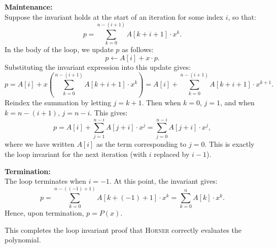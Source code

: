 \documentclass[11pt]{article}
\begin{document}
    \textbf{Maintenance:} \\
    Suppose the invariant holds at the start of an iteration for some index $i$, so that:
    \[
    p = \sum_{k=0}^{n-(i+1)} A[k+i+1] \cdot x^k.
    \]
    In the body of the loop, we update $p$ as follows:
    \[
    p \gets A[i] + x \cdot p.
    \]
    Substituting the invariant expression into this update gives:
    \[
    p = A[i] + x\left(\sum_{k=0}^{n-(i+1)} A[k+i+1] \cdot x^k\right)
    = A[i] + \sum_{k=0}^{n-(i+1)} A[k+i+1] \cdot x^{k+1}.
    \]
    Reindex the summation by letting $j = k + 1$. Then when $k = 0$, $j = 1$, and when $k = n-(i+1)$, $j = n-i$. This gives:
    \[
    p = A[i] + \sum_{j=1}^{n-i} A[j+i] \cdot x^j 
      = \sum_{j=0}^{n-i} A[j+i] \cdot x^j,
    \]
    where we have written $A[i]$ as the term corresponding to $j=0$. This is exactly the loop invariant for the next iteration (with $i$ replaced by $i-1$).
    
    \textbf{Termination:} \\
    The loop terminates when $i = -1$. At this point, the invariant gives:
    \[
    p = \sum_{k=0}^{n-((-1)+1)} A[k+(-1)+1] \cdot x^k
      = \sum_{k=0}^{n} A[k] \cdot x^k.
    \]
    Hence, upon termination, $p = P(x)$.
    
    This completes the loop invariant proof that \textsc{Horner} correctly evaluates the polynomial.
    
    
    
    \newpage \ 
    
    
    
\end{document}
